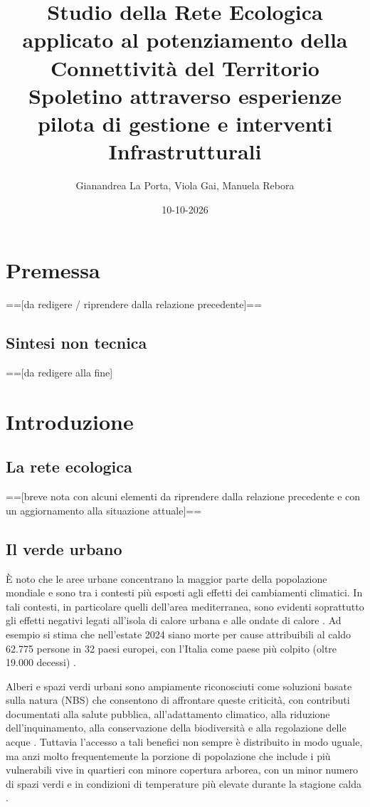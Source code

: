 \documentclass[
  a4paper,
]{book}
\title{Studio della Rete Ecologica applicato al potenziamento della Connettività del Territorio Spoletino attraverso esperienze pilota di gestione e interventi Infrastrutturali}
\author{Gianandrea La Porta, Viola Gai, Manuela Rebora}
\date{10-10-2026}
\begin{document}
\maketitle

{
\setcounter{tocdepth}{1}
\tableofcontents
}
\chapter{Premessa}\label{premessa}

=={[}da redigere / riprendere dalla relazione precedente{]}==

\section{Sintesi non tecnica}\label{sintesi-non-tecnica}

=={[}da redigere alla fine{]}

\chapter{Introduzione}\label{introduzione}

\section{La rete ecologica}\label{la-rete-ecologica}

=={[}breve nota con alcuni elementi da riprendere dalla relazione precedente e con un aggiornamento alla situazione attuale{]}==

\section{Il verde urbano}\label{il-verde-urbano}

È noto che le aree urbane concentrano la maggior parte della popolazione mondiale e sono tra i contesti più esposti agli effetti dei cambiamenti climatici.
In tali contesti, in particolare quelli dell'area mediterranea, sono evidenti soprattutto gli effetti negativi legati all'isola di calore urbana e alle ondate di calore \citep{konijnendijk2023}.
Ad esempio si stima che nell'estate 2024 siano morte per cause attribuibili al caldo 62.775 persone in 32 paesi europei, con l'Italia come paese più colpito (oltre 19.000 decessi) \citep{janos2025}.

Alberi e spazi verdi urbani sono ampiamente riconosciuti come soluzioni basate sulla natura (NBS) che consentono di affrontare queste criticità, con contributi documentati alla salute pubblica, all'adattamento climatico, alla riduzione dell'inquinamento, alla conservazione della biodiversità e alla regolazione delle acque \citep{ferrari2019, gill2007, tzoulas2007promoting, pukowiec-kurda2022, islam2012, aronson2017biodiversity}.
Tuttavia l'accesso a tali benefici non sempre è distribuito in modo uguale, ma anzi molto frequentemente la porzione di popolazione che include i più vulnerabili vive in quartieri con minore copertura arborea, con un minor numero di spazi verdi e in condizioni di temperature più elevate durante la stagione calda \citep[cfr.][]{rigolon2016, mcdonald2021}.
\end{document}
